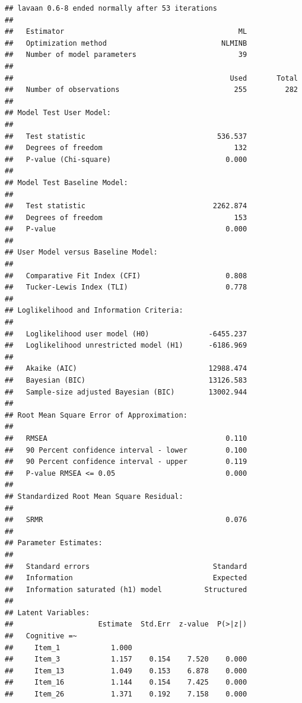 \documentclass[
]{book}
\begin{document}
\begin{verbatim}
## lavaan 0.6-8 ended normally after 53 iterations
## 
##   Estimator                                         ML
##   Optimization method                           NLMINB
##   Number of model parameters                        39
##                                                       
##                                                   Used       Total
##   Number of observations                           255         282
##                                                                   
## Model Test User Model:
##                                                       
##   Test statistic                               536.537
##   Degrees of freedom                               132
##   P-value (Chi-square)                           0.000
## 
## Model Test Baseline Model:
## 
##   Test statistic                              2262.874
##   Degrees of freedom                               153
##   P-value                                        0.000
## 
## User Model versus Baseline Model:
## 
##   Comparative Fit Index (CFI)                    0.808
##   Tucker-Lewis Index (TLI)                       0.778
## 
## Loglikelihood and Information Criteria:
## 
##   Loglikelihood user model (H0)              -6455.237
##   Loglikelihood unrestricted model (H1)      -6186.969
##                                                       
##   Akaike (AIC)                               12988.474
##   Bayesian (BIC)                             13126.583
##   Sample-size adjusted Bayesian (BIC)        13002.944
## 
## Root Mean Square Error of Approximation:
## 
##   RMSEA                                          0.110
##   90 Percent confidence interval - lower         0.100
##   90 Percent confidence interval - upper         0.119
##   P-value RMSEA <= 0.05                          0.000
## 
## Standardized Root Mean Square Residual:
## 
##   SRMR                                           0.076
## 
## Parameter Estimates:
## 
##   Standard errors                             Standard
##   Information                                 Expected
##   Information saturated (h1) model          Structured
## 
## Latent Variables:
##                    Estimate  Std.Err  z-value  P(>|z|)
##   Cognitive =~                                        
##     Item_1            1.000                           
##     Item_3            1.157    0.154    7.520    0.000
##     Item_13           1.049    0.153    6.878    0.000
##     Item_16           1.144    0.154    7.425    0.000
##     Item_26           1.371    0.192    7.158    0.000

\end{verbatim}
\end{document}
